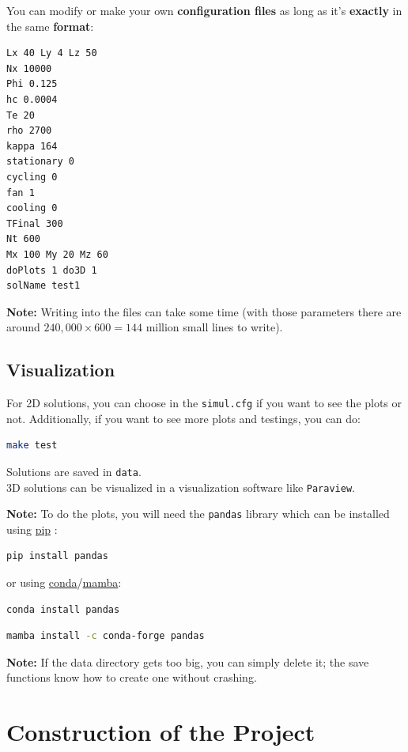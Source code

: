 \documentclass{article}
\begin{document}
You can modify or make your own \textbf{configuration files} as long as it's \textbf{exactly} in the same \textbf{format}:
\begin{lstlisting}
Lx 40 Ly 4 Lz 50
Nx 10000
Phi 0.125
hc 0.0004
Te 20
rho 2700 
kappa 164
stationary 0
cycling 0
fan 1
cooling 0
TFinal 300
Nt 600
Mx 100 My 20 Mz 60
doPlots 1 do3D 1
solName test1 
\end{lstlisting}

\textbf{Note:} Writing into the files can take some time (with those parameters there are around $240,000 \times 600 = 144$ million small lines to write). 

\subsection{Visualization}

For 2D solutions, you can choose in the \texttt{simul.cfg} if you want to see the plots or not. Additionally, if you want to see more plots and testings, you can do:
\begin{lstlisting}[language=bash]
make test
\end{lstlisting}

Solutions are saved in \texttt{data}. \\
3D solutions can be visualized in a visualization software like \texttt{Paraview}.

\textbf{Note:} To do the plots, you will need the \texttt{pandas} library which can be installed using \href{https://pip.pypa.io/en/stable/}{pip} :
\begin{lstlisting}[language=bash]
pip install pandas
\end{lstlisting}
or using \href{https://www.anaconda.com/}{conda}/\href{https://github.com/mamba-org/mamba}{mamba}:
\begin{lstlisting}[language=bash]
conda install pandas
\end{lstlisting}
\begin{lstlisting}[language=bash]
mamba install -c conda-forge pandas
\end{lstlisting}


\textbf{Note:} If the data directory gets too big, you can simply delete it; the save functions know how to create one without crashing.

\section{Construction of the Project}
\end{document}
